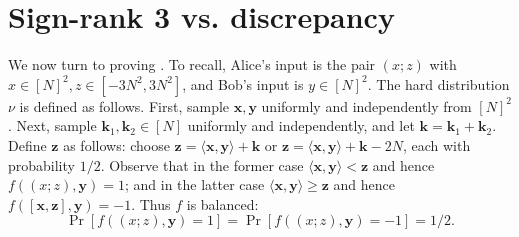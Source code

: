 \documentclass[11pt]{article}
\numberwithin{equation}{section}
\theoremstyle{definition}
\theoremstyle{plain}
\theoremstyle{definition}\newtheorem{problem}[theorem]{Problem}\theoremstyle{plain}
\newcommand{\x}{\mathbf{x}}
\newcommand{\y}{\mathbf{y}}
\newcommand{\z}{\mathbf{z}}
\newcommand{\Bk}{\mathbf{k}}   %
\newcommand{\ip}[1]{\langle #1 \rangle}
\newcommand{\pair}[2]{( #1; #2 )}
\begin{document}
%
%
%
%
%
%


\section{Sign-rank 3 vs. discrepancy}\label{sec:signrank3}

We now turn to %
proving  %
. To recall, Alice's input is the pair $\pair{x}{z}$ with $x \in [N]^2, z \in [-3N^2, 3N^2]$, and Bob's input is $y \in [N]^2$.
The hard distribution $\nu$ is defined as follows. First, sample $\x,\y$ uniformly and independently from $[N]^2$. Next, sample $\Bk_1,\Bk_2 \in [N]$ uniformly and independently, and let $\Bk = \Bk_1 + \Bk_2$. Define $\z$ as follows: choose $\z=\ip{\x,\y} +\Bk$ or $\z=\ip{\x,\y} +\Bk-2N$, each with probability $1/2$. Observe that in the former case $\ip{\x,\y} < \z$ and hence $f(\pair{x}{z},\y)=1$;
and in the latter case $\ip{\x,\y} \ge \z$ and hence $f([\x,\z],\y)=-1$. Thus $f$ is balanced:
$$
\Pr[f(\pair{x}{z},\y)=1] = \Pr[f(\pair{x}{z},\y)=-1] = 1/2.
$$

%
\end{document}
